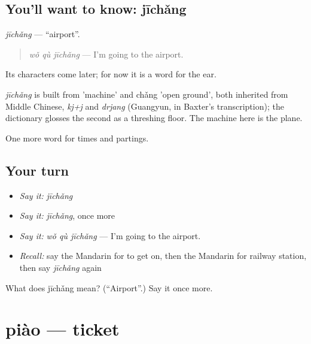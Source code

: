 \subsection*{You'll want to know: jīchǎng}
\emph{jīchǎng} — \textquotedblleft{}airport\textquotedblright{}.

\begin{quote}
\emph{wǒ qù jīchǎng} — I'm going to the airport.
\end{quote}

Its characters come later; for now it is a word for the ear.

\begin{cousinweb}
\emph{jīchǎng} is built from  'machine' and chǎng 'open ground', both inherited from Middle Chinese, \emph{kj+j} and \emph{drjang} (Guangyun, in Baxter's transcription); the dictionary glosses the second as a threshing floor. The machine here is the plane.
\end{cousinweb}

\begin{grammarlens}[title={What you've built}]
One more word for times and partings.
\end{grammarlens}

\subsection*{Your turn}
\begin{itemize}
\raggedright
  \item \emph{Say it:} \emph{jīchǎng}
  \item \emph{Say it:} \emph{jīchǎng}, once more
  \item \emph{Say it:} \emph{wǒ qù jīchǎng} — I'm going to the airport.
  \item \emph{Recall:} say the Mandarin for to get on, then the Mandarin for railway station, then say \emph{jīchǎng} again
\end{itemize}

\begin{tcolorbox}[breakable,colback=teal!4,colframe=teal!35!black,title={Before you move on}]
What does jīchǎng mean? (\textquotedblleft{}Airport\textquotedblright{}.) Say it once more.
\end{tcolorbox}
\section[piào]{piào — ticket}

\label{lesson:ZH-C73-piao}



